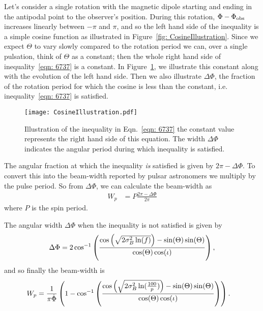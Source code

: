 \documentclass[../full_thesis/full_thesis.tex]{subfiles}
\begin{document}
Let's consider a single rotation with the magnetic dipole starting and ending in
the antipodal point to the observer's position. During this rotation, $\Phi -
\Phi_{\mathrm{obs}}$ increases linearly between $-\pi$ and $\pi$, and so the left hand side of the
inequality is a simple cosine function as illustrated in Figure~\ref{fig:
CosineIllustration}.  Since we expect $\Theta$ to vary slowly compared to the
rotation period we can, over a single pulsation, think of $\Theta$ as a
constant; then the whole right hand side of inequality~\eqref{eqn: 6737} is a
constant. In Figure~\ref{fig: CosineIllustration}, we illustrate this constant
along with the evolution of the left hand side. Then we also illustrate $\Delta\Phi$,
the fraction of the rotation period for which the cosine is less than the
constant, i.e. inequality~\eqref{eqn: 6737} is satisfied.
\begin{figure}[ht]
\centering
\texttt{[image: CosineIllustration.pdf]}
\caption{Illustration of the inequality in Eqn.~\eqref{eqn: 6737} the constant
         value represents the right hand side of this equation. The
         width $\Delta\Phi$ indicates the angular period during which inequality
         is satisfied.}
\label{fig: CosineIllustration}
\end{figure}

The angular fraction at which the inequality \emph{is} satisfied is given by
$2\pi - \Delta\Phi$. To convert this into the beam-width reported by pulsar
astronomers we multiply by the pulse period. So from $\Delta\Phi$, we can
calculate the beam-width as
\begin{align}
    W_{p} & = P \frac{2\pi - \Delta\Phi}{2\pi}
\end{align}
where $P$ is the spin period.

The angular width $\Delta\Phi$ when the inequality is not satisfied is given by
\begin{equation}
    \Delta\Phi = 2\cos^{-1}\left(
                \frac{\cos\left(\sqrt{2\sigma_{B}^{2} \ln(f)}\right) - \sin(\Theta)\sin(\Theta)}
                          {\cos(\Theta)\cos(\iota)}
                      \right),
\end{equation}
and so finally the beam-width is
\begin{align}
    W_{p} & = \frac{1}{\pi \dot{\Phi}}\left(1 -
               \cos^{-1}\left(
                   \frac{\cos\left(\sqrt{2\sigma_{B}^{2} \ln(\frac{100}{p})}\right) - \sin(\Theta)\sin(\Theta)}
                          {\cos(\Theta)\cos(\iota)}
                      \right)
                  \right).
\label{eqn: Wp}
\end{align}
\end{document}
